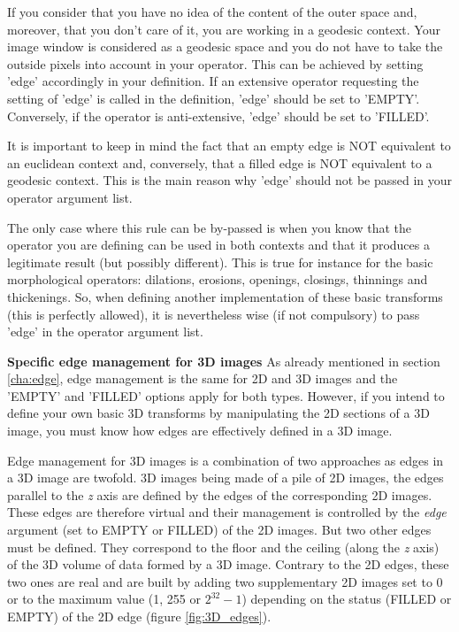 \documentclass[a4paper,10pt,oneside]{article}
\begin{document}
If you consider that you have no idea of the content of the outer space and, 
moreover, that you don't care of it, you are working in a geodesic context. 
Your image window is considered as a geodesic space and you do not have to take 
the outside pixels into account in your operator. This can be achieved by 
setting 'edge' accordingly in your definition. If  an extensive operator 
requesting the setting of 'edge' is called in the definition, 'edge' should be 
set to 'EMPTY'. Conversely, if the operator is anti-extensive, 'edge' should be 
set to 'FILLED'.

It is important to keep in mind the fact that an empty edge is NOT equivalent 
to an euclidean context and, conversely, that a filled edge is NOT equivalent 
to a geodesic context. This is the main reason why 'edge' should not be passed 
in your operator argument list.

The only case where this rule can be by-passed is when you know that the 
operator you are defining can be used in both contexts and that it produces a 
legitimate result (but possibly different). This is true for instance for the 
basic morphological operators: dilations, erosions, openings, closings, 
thinnings and thickenings. So, when defining another implementation of these 
basic transforms (this is perfectly allowed), it is nevertheless wise (if not 
compulsory) to pass 'edge' in the operator argument list.

\par

\textbf{Specific edge management for 3D images}
As already mentioned in section \ref{cha:edge}, edge management is the same for 2D and 3D
images and the 'EMPTY' and 'FILLED' options apply for both types. However, if
you intend to define your own basic 3D transforms by manipulating the 2D sections
of a 3D image, you must know how edges are effectively defined in a 3D image.

Edge management for 3D images is a combination of two approaches as edges in a
3D image are twofold. 3D images being made of a pile of 2D images, the edges
parallel to the \emph{z} axis are defined by the edges of the corresponding
2D images. These edges are therefore virtual and their management is controlled by
the \textit{edge} argument (set to EMPTY or FILLED) of the 2D images. But two
other edges must be defined. They correspond to the floor and the ceiling
(along the \emph{z} axis) of the 3D volume of data formed by a 3D image.
Contrary to the 2D edges, these two ones are real and are built by adding two
 supplementary 2D images set to 0 or to the maximum value (1, 255 or $2^{32} - 1$)
depending on the status (FILLED or EMPTY) of the 2D edge (figure \ref{fig:3D_edges}).
\end{document}
